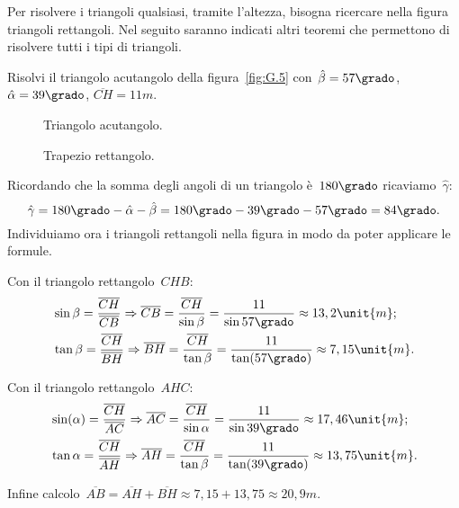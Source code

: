 Per risolvere i triangoli qualsiasi, tramite l'altezza, bisogna ricercare nella 
figura triangoli rettangoli.
Nel seguito saranno indicati altri teoremi che permettono
di risolvere tutti i tipi di triangoli.

 \begin{esempio}
Risolvi il triangolo acutangolo della figura~\ref{fig:G.5} con~$\hat{\beta} 
=57\grado$, $\hat{\alpha} =39\grado$, $\overline{CH}=11\unit{m}$.
\begin{inaccessibleblock}
 \begin{figure}[t]
\begin{minipage}[t]{.45\textwidth}
 \centering
 
 \caption{Triangolo acutangolo.}\label{fig:G.5}
\end{minipage}\hfil
\begin{minipage}[t]{.45\textwidth}
\centering
 
\caption{Trapezio rettangolo.}\label{fig:G.6}
\end{minipage}
 \end{figure}
\end{inaccessibleblock}

Ricordando che la somma degli angoli di un triangolo è~$180\grado$ 
ricaviamo~$\hat{\gamma}$:
\[ \hat{\gamma} =180\grado-\hat{\alpha} -\hat{\beta} 
=180\grado-39\grado-57\grado=84\grado.\]
Individuiamo ora i triangoli rettangoli nella figura in modo da poter applicare 
le formule.

Con il triangolo rettangolo~$CHB$:
\begin{align*}
 &\sin \beta=\frac{\overline{CH}}{\overline{CB}} \Rightarrow 
\overline{CB}=\frac{\overline{CH}}{\sin \beta}=
    \frac{11}{\sin 57\grado}\approx13,2\unit{m};\\
&\tan \beta=\frac{\overline{CH}}{\overline{BH}} \Rightarrow 
\overline{BH}=\frac{\overline{CH}}{\tan \beta}=
    \frac{11}{\tan(57\grado)}\approx7,15\unit{m}.
\end{align*}

Con il triangolo rettangolo~$AHC$:
\begin{align*}
&\sin (\alpha )=\frac{\overline{CH}}{\overline{AC}} \Rightarrow 
\overline{AC}=\frac{\overline{CH}}{\sin \alpha}=
    \frac{11}{\sin 39\grado}\approx17,46\unit{m};\\
&\tan \alpha=\frac{\overline{CH}}{\overline{AH}} \Rightarrow 
\overline{AH}=\frac{\overline{CH}}{\tan \beta}=
    \frac{11}{\tan(39\grado)}\approx13,75\unit{m}.
\end{align*}

Infine 
calcolo~$\overline{AB}=\overline{AH}+\overline{BH}\approx7,15+13,75\approx20,
9\unit{m}$.
 \end{esempio}

